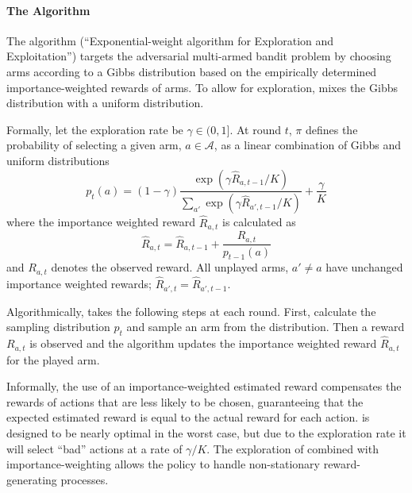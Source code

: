 \paragraph{The \ex{} Algorithm}
The \ex{} algorithm (``Exponential-weight algorithm for Exploration and Exploitation'') targets the adversarial multi-armed bandit problem \citet{auer2002nonstochastic} by choosing arms according to a Gibbs distribution based on the empirically determined importance-weighted rewards of arms. To allow for exploration, \ex{} mixes the Gibbs distribution with a uniform distribution.

Formally, let the exploration rate be $\gamma \in (0,1]$. At round $t$, $\pi$ defines the probability of selecting a given arm, $a\in\mathcal{A}$, as a linear combination of Gibbs and uniform distributions
\begin{equation}
\label{eq:exp3_sampling}
    p_{t}(a) = (1-\gamma)\dfrac{\exp(\gamma\hat{R}_{a,t-1}/K)}{\sum_{a\prime}\exp(\gamma \hat{R}_{a\prime,t-1}/K)}+\frac{\gamma}{K}
\end{equation}
where the importance weighted reward $\hat{R}_{a,t}$ is calculated as 
\begin{equation}
\label{eq:importance_weighted_reward}
    \hat{R}_{a,t} = \hat{R}_{a,t-1} + \frac{R_{a,t}}{p_{t-1}(a)}
\end{equation}
and $R_{a,t}$ denotes the observed reward. All unplayed arms, $a\prime\neq a$ have unchanged importance weighted rewards; $\hat{R}_{a\prime,t}=\hat{R}_{a\prime,t-1}$.

Algorithmically, \ex{} takes the following steps at each round. First, calculate the sampling distribution $p_{t}$ and sample an arm from the distribution. Then a reward $R_{a,t}$ is observed and the algorithm updates the importance weighted reward $\hat{R}_{a,t}$ for the played arm.

Informally, the use of an importance-weighted estimated reward compensates the rewards of actions that are less likely to be chosen, guaranteeing that the expected estimated reward is equal to the actual reward for each action. \ex{} is designed to be nearly optimal in the worst case, but due to the exploration rate it will select ``bad'' actions at a rate of $\gamma / K$. The exploration of \ex{} combined with importance-weighting allows the policy to handle non-stationary reward-generating processes.

